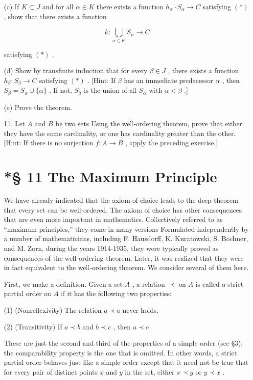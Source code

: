 (c) If \(K \subset  J\) and for all \(\alpha  \in  K\) there exists a function \({h}_{\alpha } \cdot  {S}_{\alpha } \rightarrow  C\) satisfying \(\left( *\right)\) , show that there exists a function

\[
k : \mathop{\bigcup }\limits_{{\alpha  \in  K}}{S}_{\alpha } \rightarrow  C
\]

satisfying \(\left( *\right)\) .

(d) Show by transfinite induction that for every \(\beta  \in  J\) , there exists a function \({h}_{\beta } : {S}_{\beta } \rightarrow  C\) satisfying \(\left( *\right)\) . [Hint: If \(\beta\) has an immediate predecessor \(\alpha\) , then \({S}_{\beta } = {S}_{\alpha } \cup  \{ \alpha \}\) . If not, \({S}_{\beta }\) is the union of all \({S}_{\alpha }\) with \(\alpha  < \beta\) .]

(e) Prove the theorem.

11. Let \(A\) and \(B\) be two sets Using the well-ordering theorem, prove that either they have the same cardinality, or one has cardinality greater than the other. [Hint: If there is no surjection \(f : A \rightarrow  B\) , apply the preceding exercise.]

\section*{*§ 11 The Maximum Principle \protect\sectionDagger}

We have already indicated that the axiom of choice leads to the deep theorem that every set can be well-ordered. The axiom of choice has other consequences that are even more important in mathematics. Collectively referred to as ``maximum principles,'' they come in many versions Formulated independently by a number of mathematicians, including F. Hausdorff, K. Kuratowski, S. Bochner, and M. Zorn, during the years 1914-1935, they were typically proved as consequences of the well-ordering theorem. Later, it was realized that they were in fact equivalent to the well-ordering theorem. We consider several of them here.

First, we make a definition. Given a set \(A\) , a relation \(\prec\) on \(A\) is called a strict partial order on \(A\) if it has the following two properties:

(1) (Nonreflexivity) The relation \(a \prec  a\) never holds.

(2) (Transitivity) If \(a \prec  b\) and \(b \prec  c\) , then \(a \prec  c\) .

These are just the second and third of the properties of a simple order (see §3); the comparability property is the one that is omitted. In other words, a strict partial order behaves just like a simple order except that it need not be true that for every pair of distinct points \(x\) and \(y\) in the set, either \(x \prec  y\) or \(y \prec  x\) .

